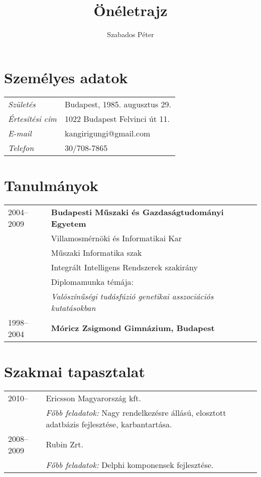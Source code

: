 \documentclass[a4paper,10pt]{article}
\title{\textbf{Önéletrajz}}
\author{Szabados Péter}
\newcommand{\pont}[1]{\emph{#1}}
\begin{document}
\maketitle

\section*{Személyes adatok}
\begin{tabular}{ll}
 \pont{Születés}&Budapest, 1985. augusztus 29.\\
 \pont{Értesítési cím}&1022 Budapest Felvinci út 11.\\
 \pont{E-mail}&kangirigungi@gmail.com\\
 \pont{Telefon}&30/708-7865\\
\end{tabular}

\section*{Tanulmányok}
\begin{tabular}{ll}
 2004--2009
  &\textbf{Budapesti Műszaki és Gazdaságtudományi Egyetem}\\
  &Villamosmérnöki és Informatikai Kar\\
  &Műszaki Informatika szak\\
  &Integrált Intelligens Rendszerek szakirány\\
  &Diplomamunka témája:\\
  &\emph{Valószínűségi tudásfúzió genetikai asszociációs kutatásokban}\\
  1998--2004&\textbf{Móricz Zsigmond Gimnázium, Budapest}
\end{tabular}

\section*{Szakmai tapasztalat}
\begin{tabular}{ll}
 2010--&Ericsson Magyarország kft.\\
  &\emph{Főbb feladatok:} Nagy rendelkezésre állású, elosztott adatbázis fejlesztése, karbantartása.\\
 2008--2009&Rubin Zrt.\\
  &\emph{Főbb feladatok:} Delphi komponensek fejlesztése.
\end{tabular}
\end{document}
